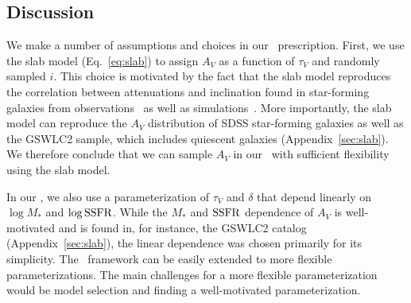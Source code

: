 \subsection{Discussion}  
We make a number of assumptions and choices in our \eda~prescription. 
First, we use the slab model (Eq.~\ref{eq:slab}) to assign $A_V$ as a
function of $\tau_V$ and randomly sampled $i$. 
This choice is motivated by the fact that the slab model reproduces
the correlation between attenuations and inclination found in star-forming
galaxies from observations~\citep{conroy2010b, wild2011, battisti2017,
salim2020} as well as simulations~\citep[\eg][]{chevallard2013,
narayanan2018, trayford2020}.
More importantly, the slab model can reproduce the $A_V$ distribution of
SDSS star-forming galaxies as well as the GSWLC2 sample, which includes
quiescent galaxies (Appendix~\ref{sec:slab}).
We therefore conclude that we can sample $A_V$ in our \eda~with sufficient
flexibility using the slab model. 

In our \eda, we also use a parameterization of $\tau_V$ and $\delta$ that
depend linearly on $\log M_*$ and $\log {\rm SSFR}$. 
While the $M_*$ and ${\rm SSFR}$ dependence of $A_V$ is well-motivated and is
found in, for instance, the \cite{salim2018} GSWLC2 catalog (Appendix~\ref{sec:slab}), 
the linear dependence was chosen primarily for its simplicity.
The \eda~framework can be easily extended to more flexible
parameterizations. 
The main challenges for a more flexible parameterization would be model
selection and finding a well-motivated parameterization. 

